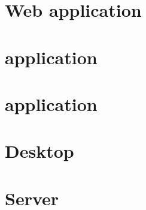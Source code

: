 %

\section{Web application}

\FloatBarrier

\section{ application}

\FloatBarrier

\section{ application}

\FloatBarrier

\section{Desktop}


\section{Server}



%

%
